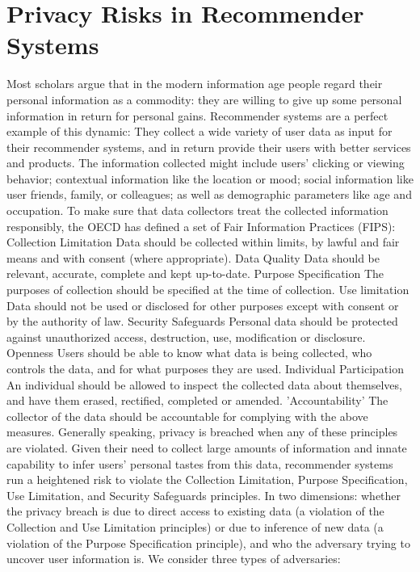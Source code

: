 \section{Privacy Risks in Recommender Systems}
Most scholars argue that in the modern information age people regard their personal information as a commodity: they are willing to give up some personal information in return for personal gains. Recommender systems are a perfect example of this dynamic: They collect a wide variety of user data as input for their recommender systems, and in return provide their users with better services and products. The information collected might include users' clicking or viewing behavior; contextual information like the location or mood; social information like user friends, family, or colleagues; as well as demographic parameters like age and occupation. To make sure that data collectors treat the collected information responsibly, the OECD has defined a set of Fair Information Practices (FIPS): Collection Limitation Data should be collected within limits, by lawful and fair means and with consent (where appropriate). Data Quality Data should be relevant, accurate, complete and kept up-to-date. Purpose Specification The purposes of collection should be specified at the time of collection. Use limitation Data should not be used or disclosed for other purposes except with consent or by the authority of law. Security Safeguards Personal data should be protected against unauthorized access, destruction, use, modification or disclosure. Openness Users should be able to know what data is being collected, who controls the data, and for what purposes they are used. Individual Participation An individual should be allowed to inspect the collected data about themselves, and have them erased, rectified, completed or amended. 'Accountability' The collector of the data should be accountable for complying with the above measures.
Generally speaking, privacy is breached when any of these principles are violated. Given their need to collect large amounts of information and innate capability to infer users' personal tastes from this data, recommender systems run a heightened risk to violate the Collection Limitation, Purpose Specification, Use Limitation, and Security Safeguards principles. In two dimensions: whether the privacy breach is due to direct access to existing data (a violation of the Collection and Use Limitation principles) or due to inference of new data (a violation of the Purpose Specification principle), and who the adversary trying to uncover user information is. We consider three types of adversaries:

